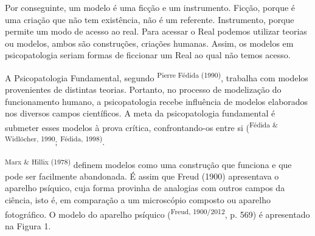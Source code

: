 \begin{multicols}{2}
\par{}Por conseguinte,\allowbreak{} um modelo é uma ficção e um instrumento.\allowbreak{} Ficção,\allowbreak{} porque é uma criação que não tem existência,\allowbreak{} não é um referente.\allowbreak{} Instrumento,\allowbreak{} porque permite um modo de acesso ao real.\allowbreak{} Para acessar o Real podemos utilizar teorias ou modelos,\allowbreak{} ambos são construções,\allowbreak{} criações humanas.\allowbreak{} Assim,\allowbreak{} os modelos em psicopatologia seriam formas de ficcionar um Real ao qual não temos acesso.\allowbreak{}
\par{}A Psicopatologia Fundamental,\allowbreak{} segundo \textsuperscript{Pierre Fédida (\allowbreak{}1990)\allowbreak{}},\allowbreak{} trabalha com modelos provenientes de distintas teorias.\allowbreak{} Portanto,\allowbreak{} no processo de modelização do funcionamento humano,\allowbreak{} a psicopatologia recebe influência de modelos elaborados nos diversos campos científicos.\allowbreak{} A meta da psicopatologia fundamental é submeter esses modelos à prova crítica,\allowbreak{} confrontando-\allowbreak{}os entre si (\allowbreak{}\textsuperscript{Fédida \&\allowbreak{\allowbreak{}\allowbreak{}}\allowbreak{} Widlöcher,\allowbreak{} 1990}; \textsuperscript{Fédida,\allowbreak{} 1998)\allowbreak{}}.\allowbreak{}
\par{}\textsuperscript{Marx \&\allowbreak{\allowbreak{}\allowbreak{}}\allowbreak{} Hillix (\allowbreak{}1978)\allowbreak{}} definem modelos como uma construção que funciona e que pode ser facilmente abandonada.\allowbreak{} É assim que Freud (\allowbreak{}1900)\allowbreak{} apresentava o aparelho psíquico,\allowbreak{} cuja forma provinha de analogias com outros campos da ciência,\allowbreak{} isto é,\allowbreak{} em comparação a um microscópio composto ou aparelho fotográfico.\allowbreak{} O modelo do aparelho psíquico (\allowbreak{}\textsuperscript{Freud,\allowbreak{} 1900\fshyp{}2012},\allowbreak{} p.\allowbreak{} 569)\allowbreak{} é apresentado na Figura 1.\allowbreak{}\par{}
\par
{
}
\end{multicols}
